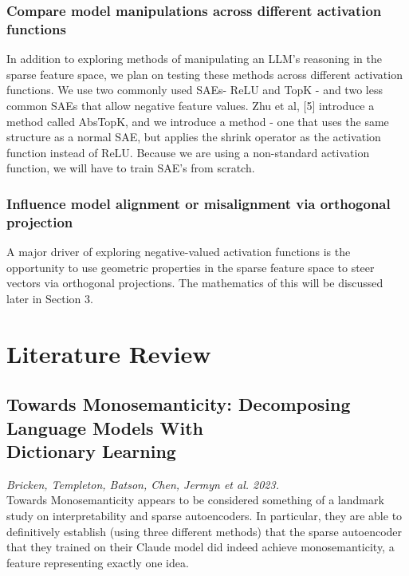 \documentclass{article}
\begin{document}
\subsubsection{Compare model manipulations across different activation functions}
    In addition to exploring methods of manipulating an LLM’s reasoning in the sparse feature space, we plan on testing these methods across different activation functions. We use two commonly used SAEs- ReLU and TopK - and two less common SAEs that allow negative feature values. Zhu et al, [5] introduce a method called AbsTopK, and we introduce a method - one that uses the same structure as a normal SAE, but applies the shrink operator as the activation function instead of ReLU. Because we are using a non-standard activation function, we will have to train SAE’s from scratch.

\subsubsection{Influence model alignment or misalignment via orthogonal projection}
    A major driver of exploring negative-valued activation functions is the opportunity to use geometric properties in the sparse feature space to steer vectors via orthogonal projections. The mathematics of this will be discussed later in Section 3.



\section{Literature Review}
\subsection{Towards Monosemanticity: Decomposing Language Models With\\Dictionary Learning}
\textit{Bricken, Templeton, Batson, Chen, Jermyn et al. 2023.}
\cite{ggc}\\

Towards Monosemanticity appears to be considered something of a landmark study on interpretability and sparse autoencoders. In particular, they are able to definitively establish (using three different methods) that the sparse autoencoder that they trained on their Claude model did indeed achieve monosemanticity, a feature representing exactly one idea.\\
\end{document}
